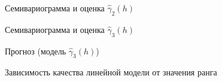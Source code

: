\begin{figure}[H]
\caption{Семивариограмма и оценка $ \widehat{\gamma}_2(h) $}
\label{img:lin-fit}
\end{figure}

\begin{figure}[H]
\caption{Семивариограмма и оценка $ \widehat{\gamma}_3(h) $}
\label{img:lin-fit-cv}
\end{figure}

\begin{figure}[H]
\caption{Прогноз (модель $ \widehat{\gamma}_3(h) $)}
\label{img:lin-fit-cv-pred}
\end{figure}

\begin{figure}[H]
\caption{Зависимость качества линейной модели от значения ранга}
\label{img:lin-range-adapt}
\end{figure}

